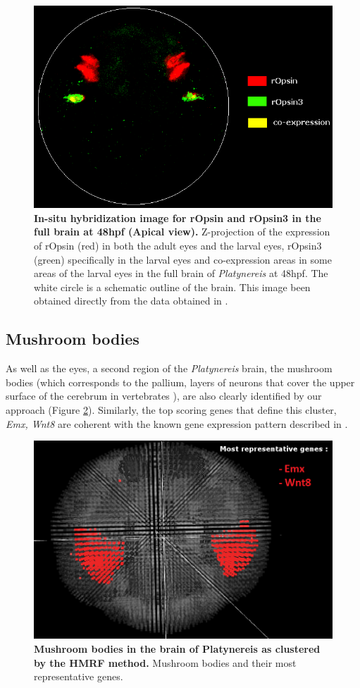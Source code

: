 	
	\begin{figure}[h]
\centerline{\includegraphics[width=0.8\linewidth]{gfx/chapter6/insitu.png}}
\caption{{\bf In-situ hybridization image for rOpsin and rOpsin3 in the full brain at 48hpf (Apical view).} Z-projection of the expression of rOpsin (red) in both the adult eyes and the larval eyes, rOpsin3 (green) specifically in the larval eyes and co-expression areas in some areas of the larval eyes in the full brain of {\it{Platynereis}} at 48hpf. The white circle is a schematic outline of the brain.  This image been obtained directly from the data obtained in \cite{Tomer10}.}
\label{fig:valideyesinsitu}
	\end{figure}
	
	
		\subsection{Mushroom bodies}
		As well as the eyes, a second region of the {\it{Platynereis}} brain, the mushroom bodies (which corresponds to the pallium, layers of neurons that cover the upper surface of the cerebrum in vertebrates \cite{Tomer10}), are also clearly identified by our approach (Figure \ref{fig:validmush}). Similarly, the top scoring genes that define this cluster, \emph{Emx, Wnt8} are coherent with the known gene expression pattern described in \cite{Tomer10}.
		
	\begin{figure}[h]
\centerline{\includegraphics[width=0.8\linewidth]{gfx/chapter6/mush.png}}
\caption{{\bf Mushroom bodies in the brain of Platynereis as clustered by the HMRF method.} Mushroom bodies and their most representative genes.}
\label{fig:validmush}
	\end{figure}
